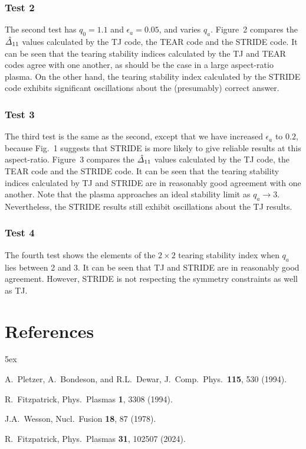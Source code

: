 \documentclass[12pt,prb,aps,notitlepage]{revtex4-1}
\begin{document}
\subsubsection{Test 2}
The second test has $q_0=1.1$ and $\epsilon_a=0.05$, and varies $q_a$. Figure~2 compares the $\hat{\mit\Delta}_{11}$ values calculated by the TJ code, the TEAR code and
the STRIDE code. It can be seen that the tearing stability indices calculated by the TJ and TEAR codes agree with one another, as should be the case in a large aspect-ratio plasma. 
On the other hand, the tearing stability index calculated by the STRIDE code exhibits significant oscillations about the (presumably) correct answer. 

\subsubsection{Test 3}
The third test  is the same as the second, except that we have increased $\epsilon_a$ to $0.2$, because
Fig.~1 suggests that STRIDE is more likely to give reliable results at this aspect-ratio. Figure~3 compares the $\hat{\mit\Delta}_{11}$ values calculated by the TJ code, the TEAR code and
the STRIDE code. It can be seen that the tearing stability indices calculated by TJ and STRIDE are in reasonably good agreement with one another. Note that the plasma approaches
an ideal stability limit as $q_a\rightarrow 3$. Nevertheless, the STRIDE results still exhibit oscillations about the TJ results. 

\subsubsection{Test 4}
The fourth test  shows the elements of the $2\times 2$ tearing stability index when $q_a$ lies between 2 and 3.   
It can be seen that TJ and STRIDE are in reasonably good agreement. However, STRIDE is not respecting the symmetry constraints as well
as TJ. 


\section*{References}
\begin{thebibliography}{99}\baselineskip 5ex

 A.~Pletzer, A.~Bondeson, and R.L.~Dewar, J.\ Comp.\ Phys.\ {\bf 115}, 530 (1994).

 R.~Fitzpatrick, Phys.\ Plasmas {\bf 1}, 3308 (1994). 

 J.A.~Wesson, Nucl.\ Fusion {\bf 18},  87 (1978). 

 R.~Fitzpatrick, Phys.\ Plasmas {\bf 31}, 102507 (2024).

\end{thebibliography}
\end{document}
